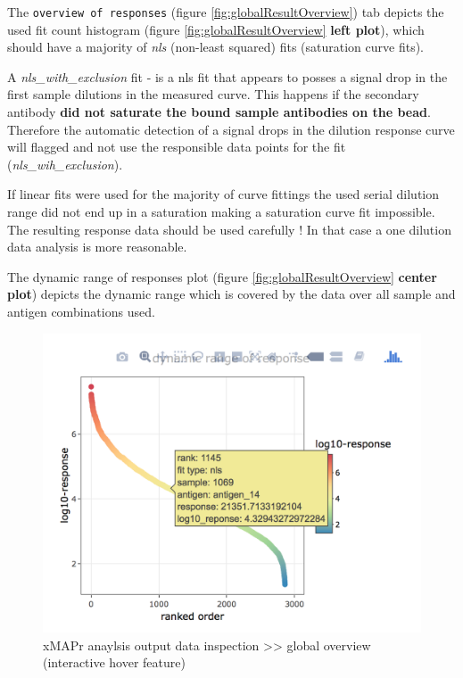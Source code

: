 \documentclass[
]{book}
\begin{document}
The \texttt{overview\ of\ responses} (figure \ref{fig:globalResultOverview}) tab depicts the used fit count histogram (figure \ref{fig:globalResultOverview} \textbf{left plot}), which should have a majority of \emph{nls} (non-least squared) fits (saturation curve fits).

A \emph{nls\_with\_exclusion} fit - is a nls fit that appears to posses a signal drop in the first sample dilutions in the measured curve. This happens if the secondary antibody \textbf{did not saturate the bound sample antibodies on the bead}. Therefore the automatic detection of a signal drops in the dilution response curve will flagged and not use the responsible data points for the fit (\emph{nls\_wih\_exclusion}).

If linear fits were used for the majority of curve fittings the used serial dilution range did not end up in a saturation making a saturation curve fit impossible. The resulting response data should be used carefully ! In that case a one dilution data analysis is more reasonable.

The dynamic range of responses plot (figure \ref{fig:globalResultOverview} \textbf{center plot}) depicts the dynamic range which is covered by the data over all sample and antigen combinations used.

\begin{figure}

{\centering \includegraphics[width=14.56in]{figures/global_result_overview1} 

}

\caption{xMAPr anaylsis output data inspection >> global overview (interactive hover feature)}\label{fig:globalResultOverview1}
\end{figure}
\end{document}

